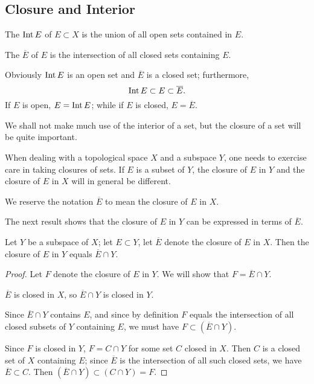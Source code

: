 \subsection{Closure and Interior}
\begin{definition}
The  $\operatorname{Int} E$ of $E\subset X$ is the union of all open sets contained in $E$.

The  $\overline{E}$ of $E$ is the intersection of all closed sets containing $E$.
\end{definition}

Obviously $\operatorname{Int} E$ is an open set and $\overline{E}$ is a closed set; furthermore,
\[\operatorname{Int} E\subset E\subset\overline{E}.\]
If $E$ is open, $E=\operatorname{Int} E$; while if $E$ is closed, $E=\overline{E}$.

We shall not make much use of the interior of a set, but the closure of a set will be quite important.

When dealing with a topological space $X$ and a subspace $Y$, one needs to exercise care in taking closures of sets. If $E$ is a subset of $Y$, the closure of $E$ in $Y$ and the closure of $E$ in $X$ will in general be different. 

\begin{notation}
We reserve the notation $\overline{E}$ to mean the closure of $E$ in $X$.
\end{notation}

The next result shows that the closure of $E$ in $Y$ can be expressed in terms of $\overline{E}$.

\begin{proposition}
Let $Y$ be a subspace of $X$; let $E\subset Y$, let $\overline{E}$ denote the closure of $E$ in $X$. Then the closure of $E$ in $Y$ equals $\overline{E}\cap Y$.
\end{proposition}

\begin{proof}
Let $F$ denote the closure of $E$ in $Y$. 
We will show that $F=\overline{E}\cap Y$.

\fbox{$\subset$} $\overline{E}$ is closed in $X$, so $\overline{E}\cap Y$ is closed in $Y$. 

Since $\overline{E}\cap Y$ contains $E$, and since by definition $F$ equals the intersection of all closed subsets of $Y$ containing $E$, we must have $F\subset(\overline{E}\cap Y)$.

\fbox{$\supset$} Since $F$ is closed in $Y$, $F=C\cap Y$ for some set $C$ closed in $X$. Then $C$ is a closed set of $X$ containing $E$; since $\overline{E}$ is the intersection of all such closed sets, we have $\overline{E}\subset C$. Then $(\overline{E}\cap Y)\subset(C\cap Y)=F$.
\end{proof}

